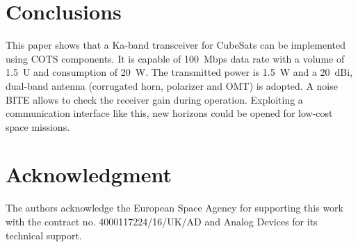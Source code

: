 \documentclass[conference,10pt,a4paper]{IEEEtran}%
\begin{document}
\section{Conclusions}
\label{sec:con}
This paper shows that a Ka-band transceiver
for CubeSats can be implemented using COTS components.
It is capable of 100~Mbps data rate with a volume of 1.5~U and consumption of 20~W.
The transmitted power is 1.5~W and a 20~dBi, dual-band antenna (corrugated horn, polarizer and OMT) is adopted.
A noise BITE allows to check the receiver gain during operation.
Exploiting a communication interface like this, new horizons could be opened for low-cost space missions.

\section*{Acknowledgment}
The authors acknowledge the European Space Agency for supporting this work with the contract no. 4000117224/16/UK/AD and Analog Devices for its technical support.



\end{document}
